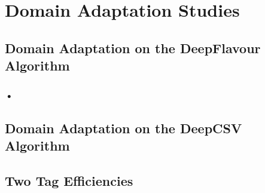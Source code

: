 \chapter{Domain Adaptation Studies}

\section{Domain Adaptation on the DeepFlavour Algorithm}

\subsection{•}

\section{Domain Adaptation on the DeepCSV Algorithm}

\section{Two Tag Efficiencies}

